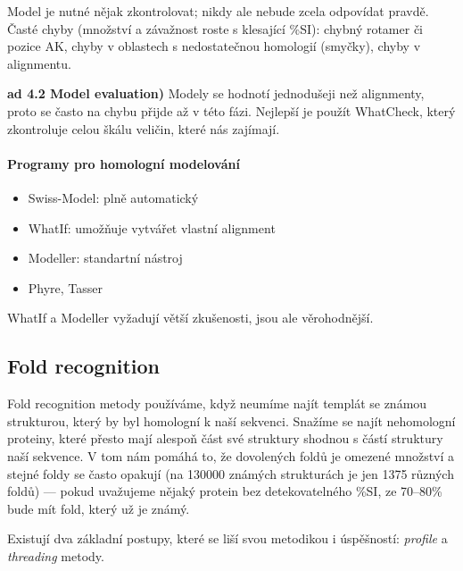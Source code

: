 \documentclass[DIV=8]{scrreprt}
\begin{document}
Model je nutné nějak zkontrolovat; nikdy ale nebude zcela odpovídat pravdě. Časté chyby (množství a závažnost roste s klesající \%SI):  chybný rotamer či pozice AK, chyby v oblastech s nedostatečnou homologií (smyčky), chyby v alignmentu.

\textbf{ad 4.2 Model evaluation)} Modely se hodnotí jednodušeji než alignmenty, proto se často na chybu přijde až v této fázi. Nejlepší je použít WhatCheck, který zkontroluje celou škálu veličin, které nás zajímají.

\paragraph{Programy pro homologní modelování}
\begin{itemize}[nosep]
    \item Swiss-Model: plně automatický
    \item WhatIf: umožňuje vytvářet vlastní alignment
    \item Modeller: standartní nástroj
    \item Phyre, Tasser
\end{itemize}



WhatIf a Modeller vyžadují větší zkušenosti, jsou ale věrohodnější.

\subsection{Fold recognition} \label{Fold recognition}


Fold recognition metody používáme, když neumíme najít templát se známou strukturou, který by byl homologní k naší sekvenci. Snažíme se najít nehomologní proteiny, které přesto mají alespoň část své struktury shodnou s částí struktury naší sekvence. V tom nám pomáhá to, že dovolených foldů je omezené množství a stejné foldy se často opakují (na 130000 známých strukturách je jen 1375 různých foldů) --- pokud uvažujeme nějaký protein bez detekovatelného \%SI, ze 70--80\% bude mít fold, který už je známý.

Existují dva základní postupy, které se liší svou metodikou i úspěšností: \emph{profile} a \emph{threading} metody.
\end{document}
